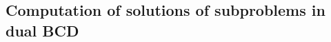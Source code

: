 \documentclass[10pt]{article}
\begin{document}






\subsection{Computation of solutions of subproblems in dual BCD}\label{apd-BCD-subpros}
\end{document}
